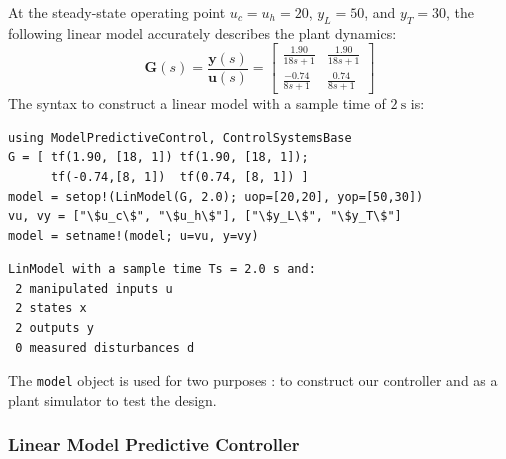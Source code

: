 At the steady-state operating point $u_c=u_h=20$, $y_L=50$, and $y_T=30$, the following linear model accurately describes the plant dynamics:
\begin{equation}
\mathbf{G}(s) = \frac{\mathbf{y}(s)}{\mathbf{u}(s)} =
\begin{bmatrix}
    \frac{1.90}{18s+1} & \frac{1.90}{18s+1} \\[3pt]
    \frac{-0.74}{8s+1} & \frac{0.74}{8s+1}
\end{bmatrix}
\end{equation}
The syntax to construct a linear model with a sample time of $\SI{2}{\second}$ is: 
\begin{verbatim}
using ModelPredictiveControl, ControlSystemsBase
G = [ tf(1.90, [18, 1]) tf(1.90, [18, 1]);
      tf(-0.74,[8, 1])  tf(0.74, [8, 1]) ]
model = setop!(LinModel(G, 2.0); uop=[20,20], yop=[50,30])
vu, vy = ["\$u_c\$", "\$u_h\$"], ["\$y_L\$", "\$y_T\$"]
model = setname!(model; u=vu, y=vy)
\end{verbatim}
\spacerepl
\begin{verbatim}
LinModel with a sample time Ts = 2.0 s and:
 2 manipulated inputs u
 2 states x
 2 outputs y
 0 measured disturbances d
\end{verbatim}
The \texttt{model} object is used for two purposes : to construct our controller and as a plant simulator to test the design. 

\subsubsection{Linear Model Predictive Controller}

